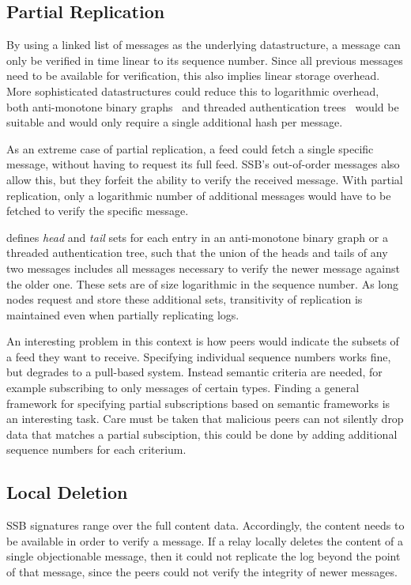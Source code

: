 \documentclass[10pt,sigconf,rewiew]{acmart}
\begin{document}
\subsection{Partial Replication}

By using a linked list of messages as the underlying datastructure, a message can only be verified in time linear to its sequence number. Since all previous messages need to be available for verification, this also implies linear storage overhead. More sophisticated datastructures could reduce this to logarithmic overhead, both anti-monotone binary graphs~\cite{buldas1998new} and threaded authentication trees~\cite{buldas2000optimally} would be suitable and would only require a single additional hash per message.

As an extreme case of partial replication, a feed could fetch a single specific message, without having to request its full feed. SSB's out-of-order messages also allow this, but they forfeit the ability to verify the received message. With partial replication, only a logarithmic number of additional messages would have to be fetched to verify the specific message.

\cite{lipmaa1999secure} defines {\em head} and {\em tail} sets for each entry in an anti-monotone binary graph or a threaded authentication tree, such that the union of the heads and tails of any two messages includes all messages necessary to verify the newer message against the older one. These sets are of size logarithmic in the sequence number. As long nodes request and store these additional sets, transitivity of replication is maintained even when partially replicating logs.

An interesting problem in this context is how peers would indicate the subsets of a feed they want to receive. Specifying individual sequence numbers works fine, but degrades to a pull-based system. Instead semantic criteria are needed, for example subscribing to only messages of certain types. Finding a general framework for specifying partial subscriptions based on semantic frameworks is an interesting task. Care must be taken that malicious peers can not silently drop data that matches a partial subsciption, this could be done by adding additional sequence numbers for each criterium.

\subsection{Local Deletion}

SSB signatures range over the full content data. Accordingly, the content needs to be available in order to verify a message. If a relay locally deletes the content of a single objectionable message, then it could not replicate the log beyond the point of that message, since the peers could not verify the integrity of newer messages.
\end{document}
